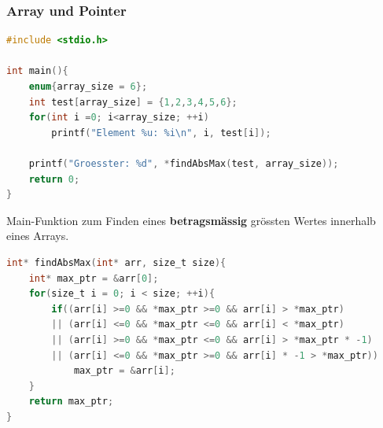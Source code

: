 		\subsubsection{Array und Pointer}
			\begin{lstlisting}[language=C]
#include <stdio.h>

int main(){
	enum{array_size = 6};
	int test[array_size] = {1,2,3,4,5,6};
	for(int i =0; i<array_size; ++i)
		printf("Element %u: %i\n", i, test[i]);
	
	printf("Groesster: %d", *findAbsMax(test, array_size));
	return 0;
}
			\end{lstlisting}
			Main-Funktion zum Finden eines \textbf{betragsmässig} grössten Wertes innerhalb eines Arrays.

			\begin{lstlisting}[language=C]
int* findAbsMax(int* arr, size_t size){
	int* max_ptr = &arr[0];
	for(size_t i = 0; i < size; ++i){
		if((arr[i] >=0 && *max_ptr >=0 && arr[i] > *max_ptr)
		|| (arr[i] <=0 && *max_ptr <=0 && arr[i] < *max_ptr)
		|| (arr[i] >=0 && *max_ptr <=0 && arr[i] > *max_ptr * -1)
		|| (arr[i] <=0 && *max_ptr >=0 && arr[i] * -1 > *max_ptr))
			max_ptr = &arr[i];
	}
	return max_ptr;
}
			\end{lstlisting}